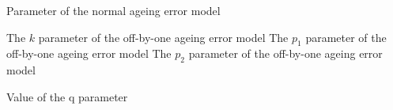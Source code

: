 \par\textbf{}\par
\par\textbf{}\par
{} {Parameter of the normal ageing error model}
\par\textbf{}\par
{} {The $k$ parameter of the off-by-one ageing error model}
 {The $p_1$ parameter of the off-by-one ageing error model}
 {The $p_2$ parameter of the off-by-one ageing error model}
\par {}\par
{} {Value of the q parameter}
